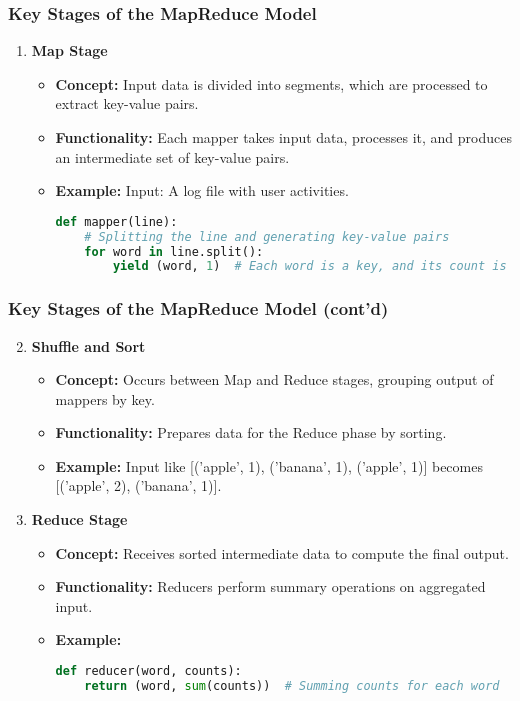 \documentclass[aspectratio=169]{beamer}
\begin{document}
\begin{frame}
  \frametitle{Key Stages of the MapReduce Model}
  \begin{enumerate}
    \item \textbf{Map Stage}
    \begin{itemize}
      \item \textbf{Concept:} Input data is divided into segments, which are processed to extract key-value pairs.
      \item \textbf{Functionality:} Each mapper takes input data, processes it, and produces an intermediate set of key-value pairs.
      \item \textbf{Example:} Input: A log file with user activities.
      \begin{lstlisting}[language=Python]
def mapper(line):
    # Splitting the line and generating key-value pairs
    for word in line.split():
        yield (word, 1)  # Each word is a key, and its count is a value
      \end{lstlisting}
    \end{itemize}
  \end{enumerate}
\end{frame}

\begin{frame}
  \frametitle{Key Stages of the MapReduce Model (cont'd)}
  \begin{enumerate}
    \setcounter{enumi}{1}
    \item \textbf{Shuffle and Sort}
    \begin{itemize}
      \item \textbf{Concept:} Occurs between Map and Reduce stages, grouping output of mappers by key.
      \item \textbf{Functionality:} Prepares data for the Reduce phase by sorting.
      \item \textbf{Example:} Input like [('apple', 1), ('banana', 1), ('apple', 1)] becomes [('apple', 2), ('banana', 1)].
    \end{itemize}

    \item \textbf{Reduce Stage}
    \begin{itemize}
      \item \textbf{Concept:} Receives sorted intermediate data to compute the final output.
      \item \textbf{Functionality:} Reducers perform summary operations on aggregated input.
      \item \textbf{Example:} 
      \begin{lstlisting}[language=Python]
def reducer(word, counts):
    return (word, sum(counts))  # Summing counts for each word
      \end{lstlisting}
    \end{itemize}
  \end{enumerate}
\end{frame}
\end{document}
